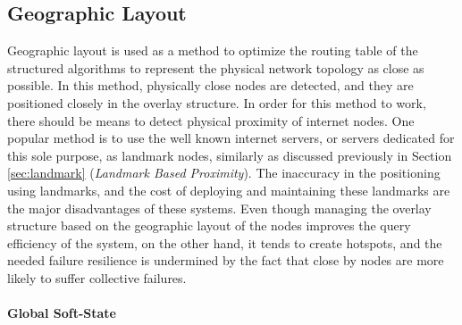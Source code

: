 \documentclass[acmcsur]{acmtrans2m}
\begin{document}

\subsection{Geographic Layout}

Geographic layout is used as a method to optimize the routing table of the
structured algorithms to represent the physical network topology as close as
possible. In this method, physically close nodes are detected, and they are
positioned closely in the overlay structure. In order for this method to work,
there should be means to detect physical proximity of internet nodes. One
popular method is to use the well known internet servers, or servers dedicated
for this sole purpose, as landmark nodes, similarly as discussed previously in
Section \ref{sec:landmark} (\textit{Landmark Based Proximity}).  The inaccuracy in
the positioning using landmarks, and the cost of deploying and maintaining these
landmarks are the major disadvantages of these systems. Even though managing the
overlay structure based on the geographic layout of the nodes improves the query
efficiency of the system, on the other hand, it tends to create hotspots, and
the needed failure resilience is undermined by the fact that close by nodes are
more likely to suffer collective failures.

\paragraph*{\bf Global Soft-State}
\end{document}
